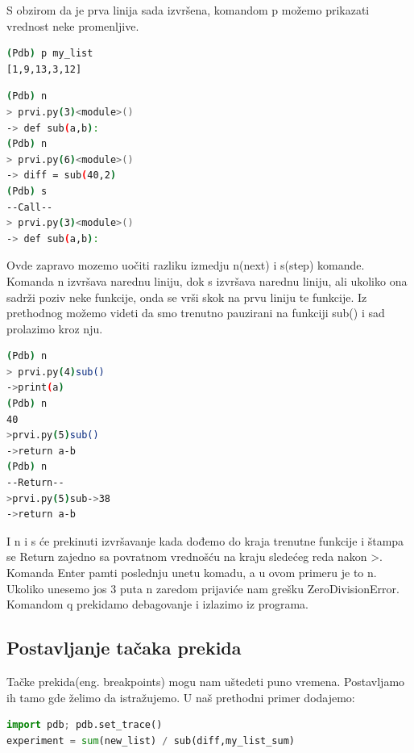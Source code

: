\documentclass[a4paper]{article}
\begin{document}
S obzirom da je prva linija sada izvršena, komandom p možemo prikazati vrednost neke
 promenljive.
\begin{lstlisting}[language = bash, caption={Štampanje promenljive \emph{my\_list}}]
(Pdb) p my_list
[1,9,13,3,12]
\end{lstlisting}
\begin{lstlisting}[language = bash, caption={Izvršavanje naredne dve linije i ulazak u funkciju \emph{sub(40, 2)}}]
(Pdb) n
> prvi.py(3)<module>()
-> def sub(a,b):
(Pdb) n
> prvi.py(6)<module>()
-> diff = sub(40,2)
(Pdb) s
--Call--
> prvi.py(3)<module>()
-> def sub(a,b):
\end{lstlisting}

Ovde zapravo mozemo uočiti razliku izmedju n(next) i s(step) komande. Komanda n izvršava narednu liniju, dok s izvršava narednu liniju, ali ukoliko ona sadrži poziv neke funkcije, onda se vrši skok na prvu liniju te funkcije. Iz prethodnog možemo videti da smo trenutno pauzirani na funkciji sub() i sad prolazimo kroz nju.
\begin{lstlisting}[language = bash, caption={Izvršavamo prve tri linije u funkciji \emph{sub(40, 2)}}]
(Pdb) n
> prvi.py(4)sub()
->print(a)
(Pdb) n
40
>prvi.py(5)sub()
->return a-b
(Pdb) n
--Return--
>prvi.py(5)sub->38
->return a-b
\end{lstlisting}

I n i s će prekinuti izvršavanje kada dođemo do kraja trenutne funkcije i štampa se \textendash \textendash Return \textendash\textendash zajedno sa povratnom vrednošću na kraju sledećeg reda nakon \textendash>. Komanda Enter pamti poslednju unetu komadu, a u ovom primeru je to n. Ukoliko unesemo jos 3 puta n zaredom prijaviće nam grešku ZeroDivisionError. Komandom q prekidamo debagovanje i izlazimo iz programa.
\subsection{Postavljanje tačaka prekida}
Tačke prekida(eng. breakpoints) mogu nam uštedeti puno vremena. Postavljamo ih tamo gde želimo da istražujemo. U naš prethodni primer dodajemo:
\begin{lstlisting}[language = python, caption = {U primer prvi.py na ovom mestu dodata prva linija}]
import pdb; pdb.set_trace()
experiment = sum(new_list) / sub(diff,my_list_sum)
\end{lstlisting}
\end{document}
